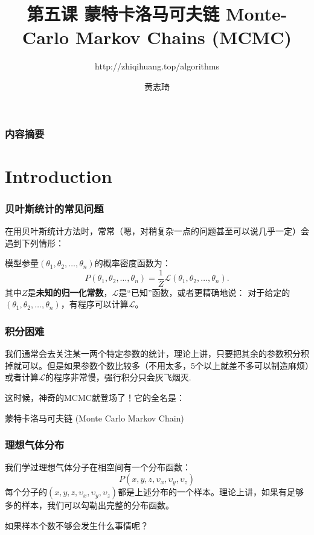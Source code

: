 \documentclass[CJK]{beamer}
\begin{document}
\bch

\title{第五课 蒙特卡洛马可夫链 Monte-Carlo Markov Chains (MCMC)}
\subtitle{http://zhiqihuang.top/algorithms}
\author{黄志琦}
\date{}

\maketitle

\begin{frame}
  \frametitle{内容摘要}
  \tableofcontents
\end{frame}


\section{Introduction}

\begin{frame}
  \frametitle{贝叶斯统计的常见问题}

  在用贝叶斯统计方法时，常常（嗯，对稍复杂一点的问题甚至可以说几乎一定）会遇到下列情形：

  \skiplines
  
  模型参量$(\theta_1,\theta_2,\ldots,\theta_n)$的概率密度函数为：
  $$P(\theta_1,\theta_2,\ldots,\theta_n) = \frac{1}{Z} \mathcal{L}(\theta_1,\theta_2,\ldots,\theta_n).$$
  其中$Z$是{\bf 未知的归一化常数}，$\mathcal{L}$是“已知”函数，或者更精确地说： 对于给定的$(\theta_1,\theta_2,\ldots,\theta_n)$，有程序可以计算$\mathcal{L}$。
  
\end{frame}


  \begin{frame}
    \frametitle{积分困难}
    我们通常会去关注某一两个特定参数的统计，理论上讲，只要把其余的参数积分积掉就可以。但是如果参数个数比较多（不用太多，5个以上就差不多可以制造麻烦）或者计算$\mathcal{L}$的程序非常慢，强行积分只会灰飞烟灭\bye.


    \skiplines
    
    这时候，神奇的MCMC就登场了！它的全名是：

   {\blue 蒙特卡洛马可夫链 (Monte Carlo Markov Chain)}


  \end{frame}

  
  \begin{frame}
    \frametitle{理想气体分布}
    我们学过理想气体分子在相空间有一个分布函数：
    $$P(x,y,z,\upsilon_x,\upsilon_y,\upsilon_z)$$
    每个分子的$(x,y,z,\upsilon_x,\upsilon_y,\upsilon_z)$都是上述分布的一个样本。理论上讲，如果有足够多的样本，我们可以勾勒出完整的分布函数。


    \skiplines
    
    如果样本个数不够会发生什么事情呢？

  \end{frame}
\end{document}
